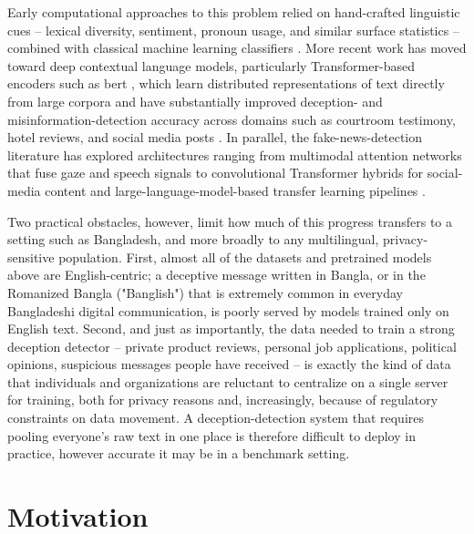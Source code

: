 Early computational approaches to this problem relied on hand-crafted linguistic cues -- lexical diversity, sentiment, pronoun usage, and similar surface statistics -- combined with classical machine learning classifiers \cite{zhou2003exploratory}. More recent work has moved toward deep contextual language models, particularly Transformer-based encoders such as \gls{bert} \cite{devlin2019bert}, which learn distributed representations of text directly from large corpora and have substantially improved deception- and misinformation-detection accuracy across domains such as courtroom testimony, hotel reviews, and social media posts \cite{fornaciari2021bertective, ilias2022explainable}. In parallel, the fake-news-detection literature has explored architectures ranging from multimodal attention networks that fuse gaze and speech signals \cite{gallardo2021detecting} to convolutional Transformer hybrids for social-media content \cite{djenouri2024federated} and large-language-model-based transfer learning pipelines \cite{alqadi2025transfer}.

Two practical obstacles, however, limit how much of this progress transfers to a setting such as Bangladesh, and more broadly to any multilingual, privacy-sensitive population. First, almost all of the datasets and pretrained models above are English-centric; a deceptive message written in Bangla, or in the Romanized Bangla ("Banglish") that is extremely common in everyday Bangladeshi digital communication, is poorly served by models trained only on English text. Second, and just as importantly, the data needed to train a strong deception detector -- private product reviews, personal job applications, political opinions, suspicious messages people have received -- is exactly the kind of data that individuals and organizations are reluctant to centralize on a single server for training, both for privacy reasons and, increasingly, because of regulatory constraints on data movement. A deception-detection system that requires pooling everyone's raw text in one place is therefore difficult to deploy in practice, however accurate it may be in a benchmark setting.

\section{Motivation}

